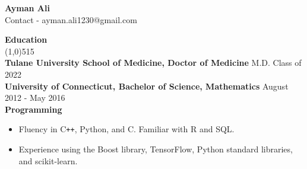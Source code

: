 \documentclass{article}
\newcommand{\s}[1]{\vspace{4mm} \noindent \large \textbf{#1} \\[-2.5mm] \linethickness{0.2mm} \line(1,0){515}}
\newcommand{\n}{\\ \noindent \normalsize}
\begin{document}
\begin{center}
	\huge \textbf{Ayman Ali} \\
	\vspace{2.0mm} \small Contact - ayman.ali1230@gmail.com
\end{center}

\s{Education}
	\n \textbf{Tulane University School of Medicine, Doctor of Medicine} \hfill M.D. Class of 2022
	\n \textbf{University of Connecticut, Bachelor of Science, Mathematics}  \hfill August 2012 - May 2016
   \n \textbf{Programming}
        \begin{itemize}
		\vspace{-2.5 mm} \item Fluency in C\texttt{++}, Python, and C. Familiar with R and SQL.
		\vspace{-2.5 mm} \item Experience using the Boost library, TensorFlow, Python standard libraries, and scikit-learn.
	  \end{itemize}
	    \vspace{-3.5mm}
	        		    	
\end{document}
